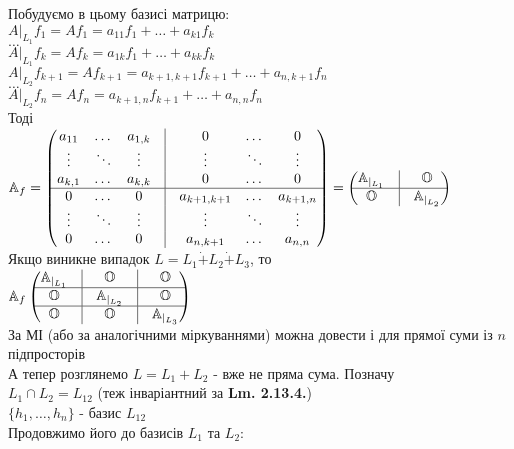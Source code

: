 \documentclass[a4paper, 14pt]{extarticle}
\def\bigline{\vspace{5mm}\\}
\begin{document}
Побудуємо в цьому базисі матрицю:\\
$A|_{L_1}f_1 = Af_1 = a_{11}f_1 + \dots + a_{k1}f_k$\\
$\dots$\\
$A|_{L_1}f_k = Af_k = a_{1k}f_1 + \dots + a_{kk}f_k$\\
$A|_{L_2}f_{k+1} = Af_{k+1} = a_{k+1,k+1}f_{k+1} + \dots + a_{n,k+1}f_n$\\
$\dots$\\
$A|_{L_2}f_n = Af_n = a_{k+1,n}f_{k+1} + \dots + a_{n,n}f_n$\\
Тоді\\
$\mathbb{A}_f = \begin{pmatrix}
a_{11} & \dots & a_{1,k} & \vline & 0 & \dots & 0 \\
\vdots & \ddots & \vdots & \vline & \vdots & \ddots & \vdots \\
a_{k,1} & \dots & a_{k,k} & \vline & 0 & \dots & 0 \\
\hline
0 & \dots & 0 & \vline & a_{k+1,k+1} & \dots & a_{k+1, n} \\
\vdots & \ddots & \vdots & \vline & \vdots & \ddots & \vdots \\
0 & \dots & 0 & \vline & a_{n,k+1} & \dots & a_{n, n} \\
\end{pmatrix} = \begin{pmatrix}
\mathbb{A}_{|_{L_1}}  & \vline & \mathbb{O} \\
 \hline
 \mathbb{O} & \vline & \mathbb{A}_{|_{L_2}}
\end{pmatrix}$
\bigline
Якщо виникне випадок $L = L_1 \dot{+} L_2 \dot{+} L_3$, то\\
$\mathbb{A}_f \begin{pmatrix} 
\mathbb{A}_{|_{L_1}}  & \vline & \mathbb{O} & \vline & \mathbb{O} \\
 \hline
\mathbb{O}  & \vline & \mathbb{A}_{|_{L_2}} & \vline & \mathbb{O} \\
 \hline
\mathbb{O}  & \vline & \mathbb{O} & \vline & \mathbb{A}_{|_{L_3}} \\
\end{pmatrix}$
\bigline
За МІ (або за аналогічними міркуваннями) можна довести і для прямої суми із $n$ підпросторів
\bigline
А тепер розглянемо $L = L_1+L_2$ - вже не пряма сума. Позначу \\ $L_1 \cap L_2 = L_{12}$ (теж інваріантний за \textbf{Lm. 2.13.4.})\\
$\{h_1,\dots, h_n \}$ - базис $L_{12}$\\
Продовжимо його до базисів $L_1$ та $L_2$:\\
\end{document}
